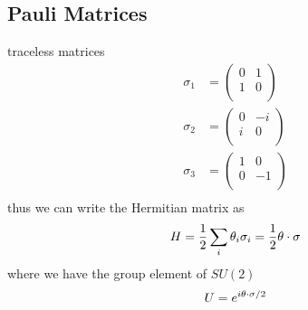 \documentclass[../main.tex]{subfiles}
\begin{document}
\subsection*{Pauli Matrices} traceless matrices
\begin{align*}
    \sigma_1 &= \begin{pmatrix}
        0 & 1 \\
        1 & 0 \\
    \end{pmatrix} \\
    \sigma_2 &= \begin{pmatrix}
        0 & -i \\
        i & 0 \\
    \end{pmatrix} \\
    \sigma_3 &= \begin{pmatrix}
        1 & 0 \\
        0 & -1 \\
    \end{pmatrix} \\
\end{align*}
thus we can write the Hermitian matrix as
\begin{align*}
    H = \frac{1}{2} \sum_i \theta_i \sigma_i = \frac{1}{2} \vb{\theta} \cdot \vb{\sigma}
\end{align*}
where we have the group element of $SU(2)$
\begin{align*}
    U = e^{i \vb\theta \cdot \vb\sigma/2}
\end{align*}
\end{document}
